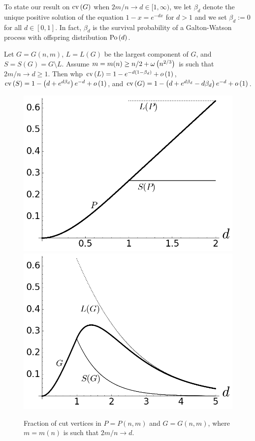 To state our result on $\operatorname{cv}\left(G\right)$ when  $2m/n \to d\in[1,\infty)$, we  let $\beta_d$ denote the unique positive solution of the equation $1-x=e^{-dx}$ for $d>1$ and we set $\beta_d:=0$ for all $d\in[0,1]$. In fact,  $\beta_d$  is the survival probability of a Galton-Watson process with offspring distribution $\operatorname{Po}\left(d\right)$.
\begin{thm}\label{thm:er_sup}
Let $G=G(n,m)$, $L=L(G)$ be the largest component of $G$, and $S=S(G)=G\setminus L$. Assume $m=m(n)\geq n/2+\omega\left(n^{2/3}\right)$ is such that $2m/n \to d\geq 1$. Then whp $\operatorname{cv}\left(L\right)=1-e^{-d\left(1-\beta_d\right)}+o\left(1\right)$, $\operatorname{cv}\left(S\right)=1-\left(d+e^{d\beta_d}\right)e^{-d}+o\left(1\right)$, and $\operatorname{cv}\left(G\right)=1-\left(d+e^{d\beta_d}-d\beta_d\right)e^{-d}+o\left(1\right)$.
\end{thm}
\begin{figure}[t]
\centering
\includegraphics[scale=0.251]{cutvertices-planar.png}\hspace*{1cm}\includegraphics[scale=0.251]{cutvertices-ER.png}
\caption{Fraction of cut vertices in $P=P(n,m)$ and $G=G(n,m)$, where $m=m(n)$ is such that $2m/n\to d$.}
\label{fig:cv}
\end{figure}
